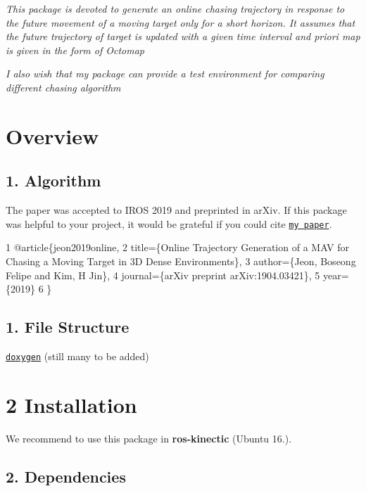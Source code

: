  



{\itshape This package is devoted to generate an online chasing trajectory in response to the future movement of a moving target only for a short horizon. It assumes that the future trajectory of target is updated with a given time interval and priori map is given in the form of Octomap}

{\itshape I also wish that my package can provide a test environment for comparing different chasing algorithm}

\section*{Overview}

\subsection*{1. Algorithm}



The paper was accepted to I\+R\+OS 2019 and preprinted in ar\+Xiv. If this package was helpful to your project, it would be grateful if you could cite \href{https://arxiv.org/pdf/1904.03421.pdf}{\tt my paper}.


\begin{DoxyCode}
1 @article\{jeon2019online,
2   title=\{Online Trajectory Generation of a MAV for Chasing a Moving Target in 3D Dense Environments\},
3   author=\{Jeon, Boseong Felipe and Kim, H Jin\},
4   journal=\{arXiv preprint arXiv:1904.03421\},
5   year=\{2019\}
6 \}
\end{DoxyCode}


\subsection*{1. File Structure}

\href{https://icsl-jeon.github.io/traj_gen_vis}{\tt doxygen} (still many to be added)

\section*{2 Installation}

We recommend to use this package in {\bfseries ros-\/kinectic} (Ubuntu 16.).

\subsection*{2. Dependencies}


